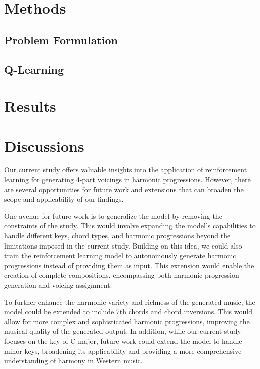 \documentclass[12pt, letterpaper]{article}
\begin{document}
\section{Methods}

\subsection{Problem Formulation}

\subsection{Q-Learning}

\section{Results}

\section{Discussions}

Our current study offers valuable insights into the application of reinforcement learning for generating 4-part voicings in harmonic progressions. However, there are several opportunities for future work and extensions that can broaden the scope and applicability of our findings.

One avenue for future work is to generalize the model by removing the constraints of the study. This would involve expanding the model's capabilities to handle different keys, chord types, and harmonic progressions beyond the limitations imposed in the current study. Building on this idea, we could also train the reinforcement learning model to autonomously generate harmonic progressions instead of providing them as input. This extension would enable the creation of complete compositions, encompassing both harmonic progression generation and voicing assignment.

To further enhance the harmonic variety and richness of the generated music, the model could be extended to include 7th chords and chord inversions. This would allow for more complex and sophisticated harmonic progressions, improving the musical quality of the generated output. In addition, while our current study focuses on the key of C major, future work could extend the model to handle minor keys, broadening its applicability and providing a more comprehensive understanding of harmony in Western music.
\end{document}
